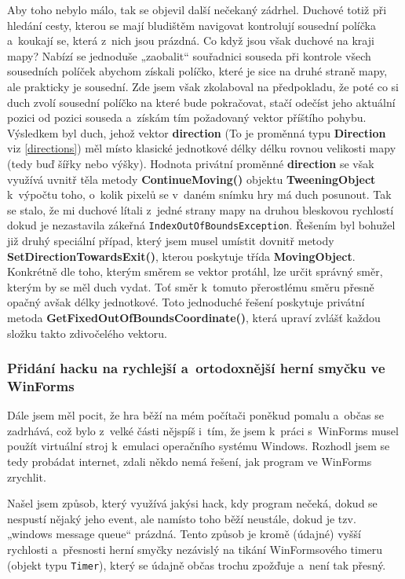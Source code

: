 \documentclass[a4]{article}
\begin{document}
Aby toho nebylo málo, tak se objevil další nečekaný zádrhel. Duchové totiž při hledání cesty, kterou se mají bludištěm navigovat kontrolují sousední políčka a~koukají se, která z~nich jsou prázdná. Co když jsou však duchové na kraji mapy? Nabízí se jednoduše „zaobalit“ souřadnici souseda při kontrole všech sousedních políček abychom získali políčko, které je sice na druhé straně mapy, ale prakticky je sousední. Zde jsem však zkolaboval na předpokladu, že poté co si duch zvolí sousední políčko na které bude pokračovat, stačí odečíst jeho aktuální pozici od pozici souseda a~získám tím požadovaný vektor příštího pohybu. Výsledkem byl duch, jehož vektor \textbf{direction} (To je proměnná typu \textbf{Direction} viz \ref{directions}) měl místo klasické jednotkové délky délku rovnou velikosti mapy (tedy buď šířky nebo výšky). Hodnota privátní proměnné \textbf{direction} se však využívá uvnitř těla metody \textbf{ContinueMoving()} objektu \textbf{TweeningObject} k~výpočtu toho, o~kolik pixelů se v~daném snímku hry má duch posunout. Tak se stalo, že mi duchové lítali z~jedné strany mapy na druhou bleskovou rychlostí dokud je nezastavila zákeřná \verb|IndexOutOfBoundsException|. Řešením byl bohužel již druhý speciální případ, který jsem musel umístit dovnitř metody \textbf{SetDirectionTowardsExit()}, kterou poskytuje třída \textbf{MovingObject}. Konkrétně dle toho, kterým směrem se vektor protáhl, lze určit správný směr, kterým by se měl duch vydat. Toť směr k~tomuto přerostlému směru přesně opačný avšak délky jednotkové. Toto jednoduché řešení poskytuje privátní metoda \textbf{GetFixedOutOfBoundsCoordinate()}, která upraví zvlášť každou složku takto zdivočelého vektoru.

\subsubsection{Přidání hacku na rychlejší a~ortodoxnější herní smyčku ve WinForms} \label{gameloophack}
Dále jsem měl pocit, že hra běží na mém počítači poněkud pomalu a~občas se zadrhává, což bylo z~velké části nějspíš i~tím, že jsem k~práci s~WinForms musel použít virtuální stroj k~emulaci operačního systému Windows. Rozhodl jsem se tedy probádat internet, zdali někdo nemá řešení, jak program ve WinForms zrychlit. 

Našel jsem způsob, který využívá jakýsi hack, kdy program nečeká, dokud se nespustí nějaký jeho event, ale namísto toho běží neustále, dokud je tzv. „windows message queue“ prázdná. Tento způsob je kromě (údajné) vyšší rychlosti a~přesnosti herní smyčky nezávislý na tikání WinFormsového timeru (objekt typu \verb|Timer|), který se údajně občas trochu zpožďuje a~není tak přesný. 
\end{document}
